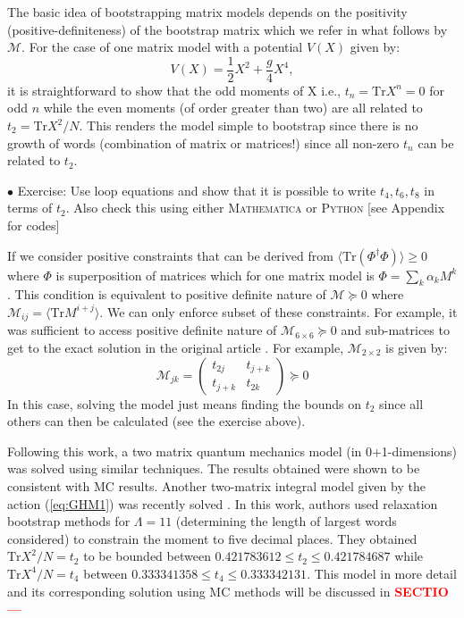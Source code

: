 \documentclass[11pt]{article}
\newcommand{\TODO}[1]{\textcolor{red}{{\bf #1}}}
\newcommand{\MA}{\textsc{Mathematica }}
\newcommand{\PY}{\textsc{Python }}
\begin{document}
The basic idea of bootstrapping matrix models depends on the 
positivity (positive-definiteness) of the bootstrap matrix which we refer in what follows 
by $\mathcal{M}$. For the case of one matrix model with a potential $V(X)$ given by: 
\begin{equation}
    V(X) = \frac12 X^2 + \frac{g}{4} X^4, 
\end{equation}
it is straightforward to show that the odd moments of X i.e., $ t_{n} = \mbox{Tr} X^n = 0$ for odd $n$
while the even moments (of order greater than two) are all related to $t_{2} = \mbox{Tr} X^2/N$. This renders the 
model simple to bootstrap since there is no growth of words (combination of matrix or matrices!)
since all non-zero $t_{n}$ can be related to $t_{2}$. 
\begin{mdframed}[backgroundcolor=blue!3] 
	\textsc{} 
	$\bullet$ Exercise: Use loop equations and show that it is possible to write $t_{4}, t_{6}, t_{8}$ in terms of $t_{2}$. Also check this using either \MA or \PY [see Appendix for codes] 
\end{mdframed} 
If we consider positive constraints that can be derived from $\langle \mbox{Tr}(\Phi^{\dagger}\Phi) \rangle \ge 0 $
where $\Phi$ is superposition of matrices which for one matrix model is 
$ \Phi = \sum_{k} \alpha_{k} M^{k}$. This condition is equivalent to positive definite nature of
$\mathcal{M} \succeq 0 $ where $ \mathcal{M}_{ij} = \langle \mbox{Tr} M^{i+j} \rangle$. 
We can only enforce subset of these constraints. For example, it was sufficient to 
access positive definite nature of $\mathcal{M}_{6 \times 6} \succeq 0 $ and sub-matrices 
to get to the exact solution in the original article \cite{Lin:2020mme}. 
For example, $\mathcal{M}_{2 \times 2}$ is given by:
\begin{equation}
	\mathcal{M}_{jk} = 
	\begin{pmatrix}
		t_{2j} & t_{j+k}  \\
		t_{j+k} & t_{2k}  
	\end{pmatrix}  \succeq 0
\end{equation}
In this case, solving the model just means finding the bounds on $t_{2}$ since all others can then be calculated (see the exercise above). 

Following this work, a two matrix quantum mechanics 
model (in 0+1-dimensions) was solved using similar techniques. 
The results obtained were shown to be consistent with MC results. 
Another two-matrix integral model given by the action 
(\ref{eq:GHM1}) was recently solved \cite{Kazakov:2021lel}. 
In this work, authors used relaxation bootstrap methods for 
$\Lambda=11$ (determining the length of largest words considered)
to constrain the moment to five decimal places. They obtained $\mathrm{Tr}X^2/N = t_2$ 
to be bounded between $ 0.421783612 \le t_2 \le 0.421784687$ while $\mathrm{Tr}X^4/N = t_4$ 
between $0.333341358 \le t_4 \le 0.333342131$.
This model in more detail 
and its corresponding solution using MC methods will be discussed in 
\TODO{SECTIO ---} 
\end{document}
